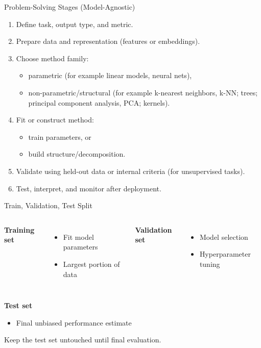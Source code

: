 \begin{frame}{Problem-Solving Stages (Model-Agnostic)}
\begin{enumerate}
  \item Define task, output type, and metric.
  \pause
  \item Prepare data and representation (features or embeddings).
  \pause
  \item Choose method family:
  \begin{itemize}
    \item parametric (for example linear models, neural nets),
    \item non-parametric/structural (for example k-nearest neighbors, k-NN; trees; principal component analysis, PCA; kernels).
  \end{itemize}
  \pause
  \item Fit or construct method:
  \begin{itemize}
    \item train parameters, or
    \item build structure/decomposition.
  \end{itemize}
  \pause
  \item Validate using held-out data or internal criteria (for unsupervised tasks).
  \pause
  \item Test, interpret, and monitor after deployment.
\end{enumerate}
\end{frame}

\begin{frame}{Train, Validation, Test Split}
\begin{columns}[T]
\textbf{Training set}
\begin{itemize}
  \item Fit model parameters
  \pause
  \item Largest portion of data
\end{itemize}

\pause
{}
\textbf{Validation set}
\begin{itemize}
  \item Model selection
  \pause
  \item Hyperparameter tuning
\end{itemize}
\end{columns}

\vspace{0.5em}
\pause
\textbf{Test set}
\begin{itemize}
  \item Final unbiased performance estimate
\end{itemize}

\pause
\begin{rlpitfall}
Keep the test set untouched until final evaluation.
\end{rlpitfall}
\end{frame}

